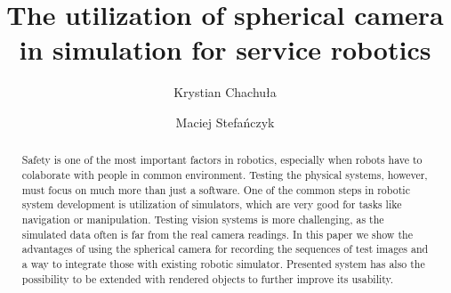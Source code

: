 \documentclass{svproc}
\begin{document}
\mainmatter

\title{The utilization of spherical camera in simulation for service robotics}

\author{Krystian Chachuła \and Maciej Stefańczyk}


\maketitle

\begin{abstract}

    Safety is one of the most important factors in robotics, especially when robots have to 
    colaborate with people in common environment. Testing the physical systems, however, must
    focus on much more than just a software. One of the common steps in robotic system development
    is utilization of simulators, which are very good for tasks like navigation or manipulation.
    Testing vision systems is more challenging, as the simulated data often is far from the
    real camera readings. In this paper we show the advantages of using the spherical camera
    for recording the sequences of test images and a way to integrate those with existing
    robotic simulator. Presented system has also the possibility to be extended with rendered
    objects to further improve its usability.


\end{abstract}
\end{document}

